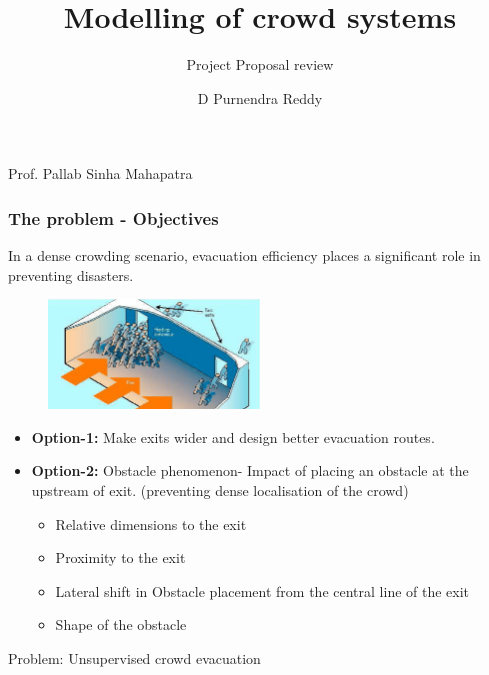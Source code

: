 \documentclass{beamer}
\title{Modelling of crowd systems}
\subtitle{Project Proposal review}
\author{D Purnendra Reddy}
\begin{document}
	\titlepage
{Prof. Pallab Sinha Mahapatra}

\begin{frame}	\frametitle{The problem - Objectives}
	In a dense crowding scenario, evacuation efficiency places a significant role in preventing disasters.
	    \begin{figure}
    \centering
        \includegraphics[width=0.5\textwidth]{crowd_panic.png}
    \end{figure}

	\begin{itemize}
	\item{\textbf{Option-1:}} Make exits wider and design better evacuation routes.
	\item{\textbf{Option-2:}} Obstacle phenomenon-	Impact of placing an obstacle at the upstream of exit. (\tiny preventing dense localisation of the crowd) 
	\begin{itemize} \scriptsize
		\item Relative dimensions to the exit
		\item Proximity to the exit 
		\item Lateral shift in Obstacle placement from the central line of the exit
		\item Shape of the obstacle
	\end{itemize}
	\end{itemize}
	Problem: Unsupervised crowd evacuation

\end{frame}
\end{document}
